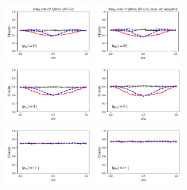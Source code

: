 \documentclass[a4paper]{article}
\begin{document}
\begin{figure}[H]
	\centering
	\includegraphics[width=0.35\textwidth]{fidelity_qc9_mit1_state0}
	\includegraphics[width=0.35\textwidth]{fidelity_qc9_mit0_state0}
	\\
	\includegraphics[width=0.35\textwidth]{fidelity_qc9_mit1_state1}
	\includegraphics[width=0.35\textwidth]{fidelity_qc9_mit0_state1}
	\\
	\includegraphics[width=0.35\textwidth]{fidelity_qc9_mit1_state2}
	\includegraphics[width=0.35\textwidth]{fidelity_qc9_mit0_state2}

\end{figure}
\end{document}
